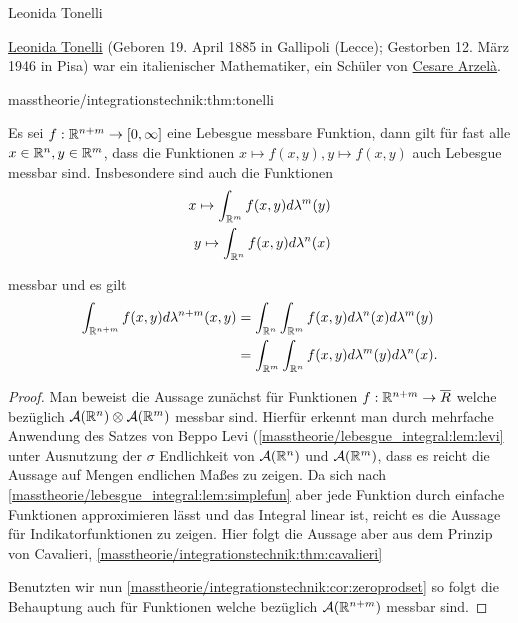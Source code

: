 \begin{emphBox}{Leonida Tonelli}{}

\par
\href{https://de.wikipedia.org/wiki/Leonida\_Tonelli}{Leonida Tonelli} (Geboren 19. April 1885 in Gallipoli (Lecce); Gestorben 12. März 1946 in Pisa) war ein italienischer Mathematiker, ein Schüler von \href{https://de.wikipedia.org/wiki/Cesare\_Arzel\%C3\%A0}{Cesare Arzelà}.
\end{emphBox}
\begin{theorem}{}{masstheorie/integrationstechnik:thm:tonelli}



\par
Es sei \(f:\mathbb{R}^{n+m}\to [0,\infty]\) eine Lebesgue messbare Funktion, dann gilt für fast alle \(x\in\mathbb{R}^n,y\in\mathbb{R}^m\), dass die Funktionen \(x\mapsto f(x,y), y\mapsto f(x,y)\) auch Lebesgue messbar sind. Insbesondere sind auch die Funktionen
\begin{align*}
x \mapsto \int_{\mathbb{R}^m} f(x,y) d\lambda^m(y)\\
y \mapsto \int_{\mathbb{R}^n} f(x,y) d\lambda^n(x)
\end{align*}
\par
messbar und es gilt
\begin{align*}
\int_{\mathbb{R}^{n+m}} f(x,y) d\lambda^{n+m}(x,y) &= \int_{\mathbb{R}^n}\int_{\mathbb{R}^m} f(x,y) d\lambda^{n}(x)d\lambda^m(y)\\
&=
\int_{\mathbb{R}^m}\int_{\mathbb{R}^n} f(x,y) d\lambda^{m}(y)d\lambda^n(x).
\end{align*}\end{theorem}

\begin{proof}
 Man beweist die Aussage zunächst für Funktionen \(f:\mathbb{R}^{n+m}\to\overline{R}\) welche bezüglich \(\mathcal{A}(\mathbb{R}^n)\otimes\mathcal{A}(\mathbb{R}^m)\) messbar sind. Hierfür erkennt man durch mehrfache Anwendung des Satzes von Beppo Levi (\cref{masstheorie/lebesgue_integral:lem:levi}  unter Ausnutzung der \(\sigma\) Endlichkeit von \(\mathcal{A}(\mathbb{R}^n)\) und \(\mathcal{A}(\mathbb{R}^m)\), dass es reicht die Aussage auf Mengen endlichen Maßes zu zeigen. Da sich nach \cref{masstheorie/lebesgue_integral:lem:simplefun} aber jede Funktion durch einfache Funktionen approximieren lässt und das Integral linear ist, reicht es die Aussage für Indikatorfunktionen zu zeigen. Hier folgt die Aussage aber aus dem Prinzip von Cavalieri, \cref{masstheorie/integrationstechnik:thm:cavalieri} 

\par
Benutzten wir nun \cref{masstheorie/integrationstechnik:cor:zeroprodset} so folgt die Behauptung auch für Funktionen welche bezüglich \(\mathcal{A}(\mathbb{R}^{n+m})\) messbar sind.
\end{proof}

